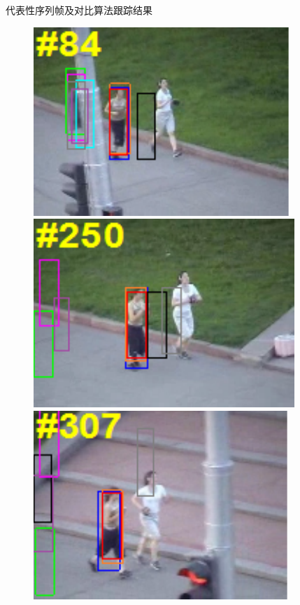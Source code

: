 \begin{frame}{代表性序列帧及对比算法跟踪结果}

\begin{figure}[htp]
	
	\centering
\includegraphics[width=0.31\textheight,height=0.25\textheight]{figures/Figure2d1.pdf}
\includegraphics[width=0.31\textheight,height=0.25\textheight]{figures/Figure2d2.pdf}
\includegraphics[width=0.31\textheight,height=0.25\textheight]{figures/Figure2d3.pdf}\\


\end{figure}
\end{frame}
